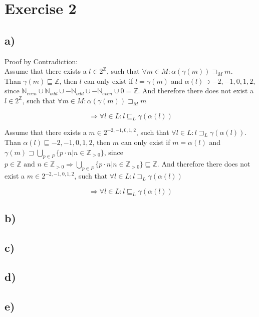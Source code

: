 \documentclass[fleqn,12pt]{article}
\begin{document}
\section*{Exercise 2}
\subsection*{a)}

Proof by Contradiction:\\
Assume that there exists a $l \in 2^{\mathbb{Z}}$, such that $\forall m \in M:\alpha(\gamma(m)) \sqsupset_M m$.\\
Than $\gamma(m) \sqsubseteq \mathbb{Z}$, then $l$ can only exist if $l=\gamma(m)$ and $\alpha(l)\ni {-2,-1,0,1,2}$, since $\mathbb{N}_{even} \cup \mathbb{N}_{odd} \cup -\mathbb{N}_{odd} \cup -\mathbb{N}_{even} \cup {0}=\mathbb{Z}$. And therefore there does not exist a $l \in 2^{\mathbb{Z}}$, such that $\forall m \in M:\alpha(\gamma(m)) \sqsupset_M m$

$$\Rightarrow \forall l \in L: l \sqsubseteq_{L} \gamma(\alpha(l))$$

Assume that there exists a $m \in 2^{-2,-1,0,1,2}$, such that $\forall l \in L:l \sqsupset_L \gamma(\alpha(l))$.\\
Than $\alpha(l) \sqsubseteq {-2,-1,0,1,2}$, then $m$ can only exist if $m=\alpha(l)$ and $\gamma(m)\sqsupset \bigcup_{p \in P}\{p \cdot n | n \in \mathbb{Z}_{>0}\}$, since $p \in \mathbb{Z} \text{ and } n \in \mathbb{Z}_{>0} \Rightarrow \bigcup_{p \in P}\{p \cdot n | n \in \mathbb{Z}_{>0}\} \sqsubseteq \mathbb{Z}$. And therefore there does not exist a $m \in 2^{-2,-1,0,1,2}$, such that $\forall l \in L:l \sqsupset_L \gamma(\alpha(l))$

$$\Rightarrow \forall l \in L:l \sqsubseteq_L \gamma(\alpha(l))$$
\subsection*{b)}

\subsection*{c)}

\subsection*{d)}

\subsection*{e)}
\end{document}
